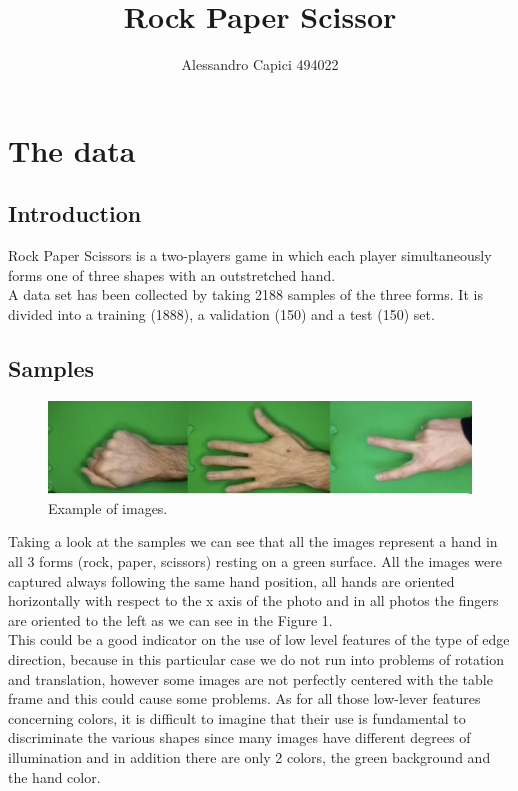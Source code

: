 \documentclass[a4paper,10pt]{article}
\begin{document}
\title{\textbf{Rock Paper Scissor}}
\author{
	Alessandro Capici 494022\\
}
\maketitle
\section{The data}
\subsection{Introduction}
Rock Paper Scissors is a two-players game in which each player simultaneously forms one of three shapes with an outstretched hand.\\
A data set has been collected by taking 2188 samples of the three forms. It is divided into a training (1888), a validation (150) and a test (150) set.
\subsection{Samples}
\begin{figure}[h!]
    \centering
    \includegraphics[scale=0.17]{img/0.png}
    \caption{Example of images.}
\end{figure}
Taking a look at the samples we can see that all the images represent a hand in all 3 forms (rock, paper, scissors) resting on a green surface. All the images were captured always following the same hand position, all hands are oriented horizontally with respect to the x axis of the photo and in all photos the fingers are oriented to the left as we can see in the Figure 1. \\
This could be a good indicator on the use of low level features of the type of edge direction, because in this particular case we do not run into problems of rotation and translation, however some images are not perfectly centered with the table frame and this could cause some problems. As for all those low-lever features concerning colors, it is difficult to imagine that their use is fundamental to discriminate the various shapes since many images have different degrees of illumination and in addition there are only 2 colors, the green background and the hand color.
\end{document}

